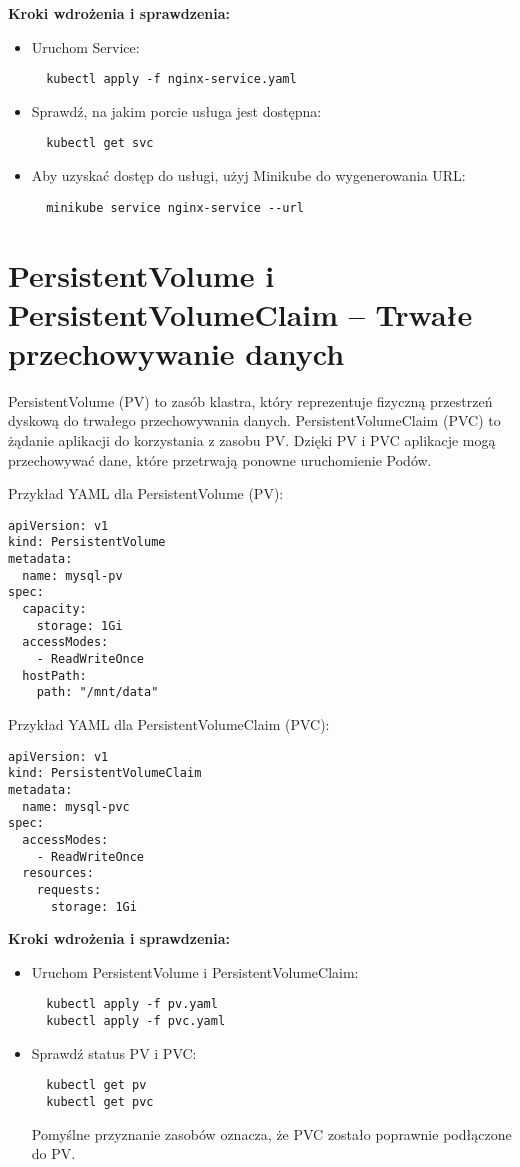 \documentclass{article}
\begin{document}
\textbf{Kroki wdrożenia i sprawdzenia:}
\begin{itemize}
  \item Uruchom Service:
  \begin{lstlisting}
  kubectl apply -f nginx-service.yaml
  \end{lstlisting}
  \item Sprawdź, na jakim porcie usługa jest dostępna:
  \begin{lstlisting}
  kubectl get svc
  \end{lstlisting}
    \item Aby uzyskać dostęp do usługi, użyj Minikube do wygenerowania URL:
  \begin{lstlisting}
  minikube service nginx-service --url
  \end{lstlisting}
\end{itemize}

\section{PersistentVolume i PersistentVolumeClaim – Trwałe przechowywanie danych}

PersistentVolume (PV) to zasób klastra, który reprezentuje fizyczną przestrzeń dyskową do trwałego przechowywania danych. PersistentVolumeClaim (PVC) to żądanie aplikacji do korzystania z zasobu PV. Dzięki PV i PVC aplikacje mogą przechowywać dane, które przetrwają ponowne uruchomienie Podów.

Przykład YAML dla PersistentVolume (PV):
\begin{lstlisting}
apiVersion: v1
kind: PersistentVolume
metadata:
  name: mysql-pv
spec:
  capacity:
    storage: 1Gi
  accessModes:
    - ReadWriteOnce
  hostPath:
    path: "/mnt/data"
\end{lstlisting}

Przykład YAML dla PersistentVolumeClaim (PVC):
\begin{lstlisting}
apiVersion: v1
kind: PersistentVolumeClaim
metadata:
  name: mysql-pvc
spec:
  accessModes:
    - ReadWriteOnce
  resources:
    requests:
      storage: 1Gi
\end{lstlisting}

\textbf{Kroki wdrożenia i sprawdzenia:}
\begin{itemize}
  \item Uruchom PersistentVolume i PersistentVolumeClaim:
  \begin{lstlisting}
  kubectl apply -f pv.yaml
  kubectl apply -f pvc.yaml
  \end{lstlisting}
  \item Sprawdź status PV i PVC:
  \begin{lstlisting}
  kubectl get pv
  kubectl get pvc
  \end{lstlisting}
  Pomyślne przyznanie zasobów oznacza, że PVC zostało poprawnie podłączone do PV.
\end{itemize}
\end{document}
